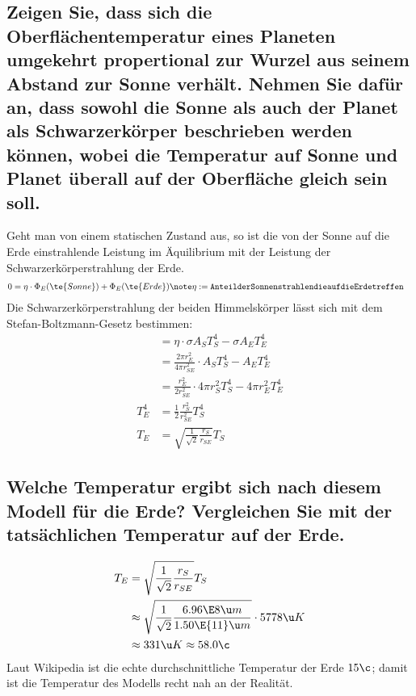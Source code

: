 \documentclass[ex]{exercise}
\begin{document}
\subsection{Zeigen Sie, dass sich die Oberflächentemperatur eines Planeten umgekehrt 
propertional zur Wurzel aus seinem Abstand zur Sonne verhält. Nehmen Sie dafür an, dass sowohl 
die Sonne als auch der Planet als Schwarzerkörper beschrieben werden können,
wobei die Temperatur auf Sonne und Planet überall auf der Oberfläche gleich sein soll.}

\dottedlinett

Geht man von einem statischen Zustand aus, so ist die von der Sonne 
auf die Erde einstrahlende Leistung im Äquilibrium mit der Leistung der
Schwarzerkörperstrahlung der Erde. 
\begin{align*}
    0 &= \eta \cdot \Phi_E(\te{Sonne}) + \Phi_E(\te{Erde})\note \eta :=\tt{Anteil der Sonnenstrahlen}{die auf die Erde treffen}
\end{align*}
Die Schwarzerkörperstrahlung der beiden Himmelskörper lässt sich 
mit dem Stefan-Boltzmann-Gesetz bestimmen:
\begin{align*}
    &= \eta \cdot \sigma A_S  T_S^4 - \sigma A_E T_E^4\\
    &= \frac{2\pi r_E^2}{4\pi r_{SE}^2}\cdot A_S  T_S^4 - A_E T_E^4\\
    &= \frac{r_E^2}{2 r_{SE}^2}\cdot  4\pi r_S^2  T_S^4 - 4\pi r_E^2 T_E^4\\
    T_E^4 &= {\frac12\frac{r_S^2}{r_{SE}^2} T_S^4 }\\
    T_E &= \sqrt{\frac{1}{\sqrt 2}\frac{r_S}{r_{SE}}} T_S
\end{align*} 

\subsection{Welche Temperatur ergibt sich nach diesem Modell für die Erde? Vergleichen Sie mit der tatsächlichen 
Temperatur auf der Erde.}

\dottedlinete

\begin{align*}
    T_E &= \sqrt{\frac{1}{\sqrt 2}\frac{r_S}{r_{SE}}} T_S\\
    &\approx \sqrt{\frac{1}{\sqrt 2}\frac{6.96\E8\u m}{1.50\E{11}\u m}} \cdot 5778\u K\\
    &\approx 331\u K \approx 58.0\c
\end{align*} 
Laut Wikipedia ist die echte durchschnittliche Temperatur der Erde \(15\c\); damit ist 
die Temperatur des Modells recht nah an der Realität. 
\end{document}

